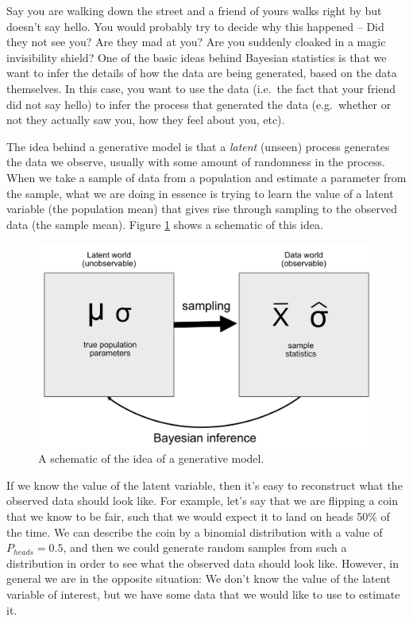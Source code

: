 \documentclass[12pt,]{book}
\theoremstyle{definition}
\theoremstyle{definition}
\theoremstyle{definition}
\theoremstyle{remark}
\begin{document}
Say you are walking down the street and a friend of yours walks right by but doesn't say hello. You would probably try to decide why this happened -- Did they not see you? Are they mad at you? Are you suddenly cloaked in a magic invisibility shield? One of the basic ideas behind Bayesian statistics is that we want to infer the details of how the data are being generated, based on the data themselves. In this case, you want to use the data (i.e.~the fact that your friend did not say hello) to infer the process that generated the data (e.g.~whether or not they actually saw you, how they feel about you, etc).

The idea behind a generative model is that a \emph{latent} (unseen) process generates the data we observe, usually with some amount of randomness in the process. When we take a sample of data from a population and estimate a parameter from the sample, what we are doing in essence is trying to learn the value of a latent variable (the population mean) that gives rise through sampling to the observed data (the sample mean). Figure \ref{fig:GenerativeModel} shows a schematic of this idea.

\begin{figure}
\includegraphics[width=0.8\linewidth]{images/BayesianInference} \caption{A schematic of the idea of a generative model.}\label{fig:GenerativeModel}
\end{figure}

If we know the value of the latent variable, then it's easy to reconstruct what the observed data should look like. For example, let's say that we are flipping a coin that we know to be fair, such that we would expect it to land on heads 50\% of the time. We can describe the coin by a binomial distribution with a value of \(P_{heads}=0.5\), and then we could generate random samples from such a distribution in order to see what the observed data should look like. However, in general we are in the opposite situation: We don't know the value of the latent variable of interest, but we have some data that we would like to use to estimate it.
\end{document}
